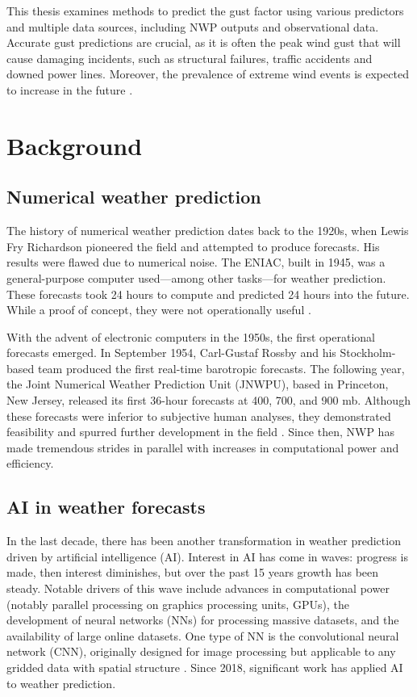 This thesis examines methods to predict the gust factor using various predictors and multiple data sources, including NWP outputs and observational data. Accurate gust predictions are crucial, as it is often the peak wind gust that will cause damaging incidents, such as structural failures, traffic accidents and downed power lines. Moreover, the prevalence of extreme wind events is expected to increase in the future \cite{nasa_extreme_weather}.

\section{Background}

\subsection{Numerical weather prediction}
The history of numerical weather prediction dates back to the 1920s, when Lewis Fry Richardson pioneered the field and attempted to produce forecasts. His results were flawed due to numerical noise. The ENIAC, built in 1945, was a general-purpose computer used—among other tasks—for weather prediction. These forecasts took 24 hours to compute and predicted 24 hours into the future. While a proof of concept, they were not operationally useful \cite{TheENIACForecastsARecreation}. 

With the advent of electronic computers in the 1950s, the first operational forecasts emerged. In September 1954, Carl-Gustaf Rossby and his Stockholm-based team produced the first real-time barotropic forecasts. The following year, the Joint Numerical Weather Prediction Unit (JNWPU), based in Princeton, New Jersey, released its first 36-hour forecasts at 400, 700, and 900 mb. Although these forecasts were inferior to subjective human analyses, they demonstrated feasibility and spurred further development in the field \cite{historyNWP}. Since then, NWP has made tremendous strides in parallel with increases in computational power and efficiency.

\subsection{AI in weather forecasts}
In the last decade, there has been another transformation in weather prediction driven by artificial intelligence (AI). Interest in AI has come in waves: progress is made, then interest diminishes, but over the past 15 years growth has been steady. Notable drivers of this wave include advances in computational power (notably parallel processing on graphics processing units, GPUs), the development of neural networks (NNs) for processing massive datasets, and the availability of large online datasets. One type of NN is the convolutional neural network (CNN), originally designed for image processing but applicable to any gridded data with spatial structure \cite{canNNBeatNWP}. Since 2018, significant work has applied AI to weather prediction.

